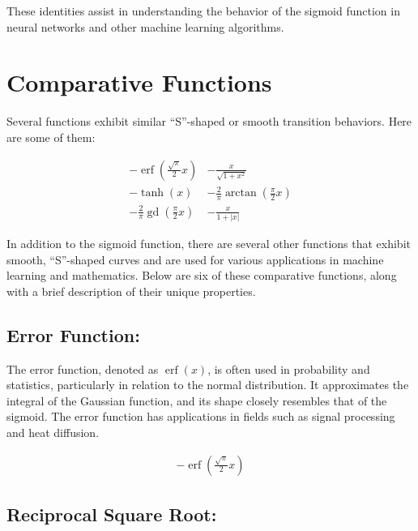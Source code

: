 \documentclass[
  12 pt,
  a4paper,
]{book}
\numberwithin{equation}{section}
\theoremstyle{plain}      %
\theoremstyle{definition} %
\theoremstyle{remark}     %
\theoremstyle{note}         %
\begin{document}
These identities assist in understanding the behavior of the sigmoid
function in neural networks and other machine learning algorithms.

\newpage

\hypertarget{comparative-functions}{%
\section{Comparative Functions}\label{comparative-functions}}

Several functions exhibit similar ``S''-shaped or smooth transition
behaviors. Here are some of them:

\[
\begin{array}{ll}
-\operatorname{erf}\left(\frac{\sqrt{\pi}}{2} x\right) & -\frac{x}{\sqrt{1+x^2}} \\
-\tanh (x) & -\frac{2}{\pi} \arctan \left(\frac{\pi}{2} x\right) \\
-\frac{2}{\pi} \operatorname{gd}\left(\frac{\pi}{2} x\right) & -\frac{x}{1+|x|}
\end{array}
\]

In addition to the sigmoid function, there are several other functions
that exhibit smooth, ``S''-shaped curves and are used for various
applications in machine learning and mathematics. Below are six of these
comparative functions, along with a brief description of their unique
properties.

\hypertarget{error-function}{%
\subsection{Error Function:}\label{error-function}}

The error function, denoted as \(\operatorname{erf}(x)\), is often used
in probability and statistics, particularly in relation to the normal
distribution. It approximates the integral of the Gaussian function, and
its shape closely resembles that of the sigmoid. The error function has
applications in fields such as signal processing and heat diffusion.

\begin{align}
-\operatorname{erf}\left(\frac{\sqrt{\pi}}{2} x\right)
\end{align}

\hypertarget{reciprocal-square-root}{%
\subsection{Reciprocal Square Root:}\label{reciprocal-square-root}}
\end{document}
